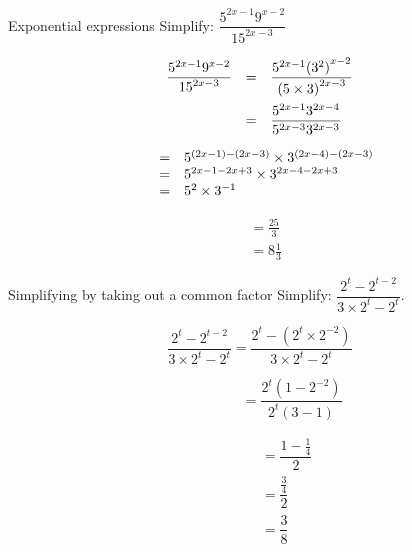      
\begin{wex}
{Exponential expressions}
{Simplify: $\dfrac{{5}^{2x-1}  {9}^{x-2}}{{15}^{2x-3}}$}
{

\begin{equation*}
\begin{array}{lcl} \dfrac{{5}^{2x-1}  {9}^{x-2}}{{15}^{2x-3}}& =& \dfrac{{5}^{2x-1}  {({3}^{2})}^{x-2}}{{(5\times3)}^{2x-3}}\hfill \vspace{5pt}\\
		  & =& \dfrac{{5}^{2x-1}  {3}^{2x-4}}{{5}^{2x-3}  {3}^{2x-3}}\hfill 
\end{array}
\end{equation*}
  
\begin{equation*}
\begin{array}{lcl}
& =& {5}^{(2x-1)-(2x-3)} \times {3}^{(2x-4)-(2x-3)}\hfill \\ 
& =& 5^{2x-1-2x+3} \times 3^{2x-4 - 2x+3} \\
& =& {5}^{2} \times {3}^{-1}\hfill \end{array}
\end{equation*}


\begin{align*}
  &= \frac{25}{3} \\
  &= 8\frac{1}{3}
\end{align*}
}
\end{wex}


\begin{wex}
{Simplifying by taking out a common factor}
{Simplify: $\dfrac{2^t-2^{t-2}}{3 \times 2^t - 2^t}$.}
{%
\begin{equation*}
  \dfrac{2^t-2^{t-2}}{3 \times 2^t-2^t} =
  \dfrac{2^t-(2^t \times 2^{-2})}{3 \times 2^t - 2^t}
\end{equation*}

\begin{equation*}
  \phantom{\frac{2^t-2^{t-2}}{3 \times 2^t-2^t}} = \frac{2^t(1-2^{-2})}{2^t(3-1)}
\end{equation*}

\begin{align*}
  \phantom{\frac{2^t-2^{t-2}}{3.2^t-2^t}}
  &= \dfrac{1- \frac{1}{4}}{2} \\
  &= \dfrac{\frac{3}{4}}{2} \\
  &= \dfrac{3}{8} 
\end{align*}
} 
\end{wex}


